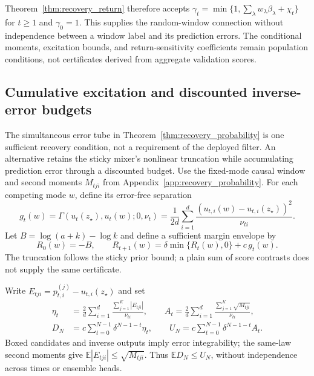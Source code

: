 Theorem~\ref{thm:recovery_return} therefore accepts
$\gamma_t=\min\{1,\sum_\lambda w_\lambda\beta_\lambda+\chi_t\}$ for $t\ge1$ and $\gamma_0=1$.
This supplies the random-window connection without independence between a window label and its prediction errors.
The conditional moments, excitation bounds, and return-sensitivity coefficients remain population conditions, not certificates derived from aggregate validation scores.

\subsection{Cumulative excitation and discounted inverse-error budgets}
\label{app:cumulative_recovery}

The simultaneous error tube in Theorem~\ref{thm:recovery_probability} is one sufficient recovery condition, not a requirement of the deployed filter.
An alternative retains the sticky mixer's nonlinear truncation while accumulating prediction error through a discounted budget.
Use the fixed-mode causal window and second moments $M_{tji}$ from Appendix~\ref{app:recovery_probability}.
For each competing mode $w$, define its error-free separation
\begin{equation}
 g_t(w)=\Gamma(u_t(z_\star),u_t(w);0,\nu_t)
 =\frac{1}{2d}\sum_{i=1}^{d}
 \frac{(u_{t,i}(w)-u_{t,i}(z_\star))^2}{\nu_{ti}}.
 \label{eq:cumulative_ideal_separation}
\end{equation}
Let $B=\log(a+k)-\log k$ and define a sufficient margin envelope by
\begin{equation}
 R_0(w)=-B,\qquad
 R_{t+1}(w)=\delta\min\{R_t(w),0\}+c\,g_t(w).
 \label{eq:cumulative_margin_recursion}
\end{equation}
The truncation follows the sticky prior bound; a plain sum of score contrasts does not supply the same certificate.

Write $E_{tji}=p_{t,i}^{(j)}-u_{t,i}(z_\star)$ and set
\begin{align}
 \eta_t&=\frac{2}{d}\sum_{i=1}^{d}
 \frac{\sum_{j=1}^{K}|E_{tji}|}{\nu_{ti}},\qquad
 A_t=\frac{2}{d}\sum_{i=1}^{d}
 \frac{\sum_{j=1}^{K}\sqrt{M_{tji}}}{\nu_{ti}},\\
 D_N&=c\sum_{t=0}^{N-1}\delta^{N-1-t}\eta_t,\qquad
 U_N=c\sum_{t=0}^{N-1}\delta^{N-1-t}A_t.
 \label{eq:discounted_inverse_error_budget}
\end{align}
Boxed candidates and inverse outputs imply error integrability; the same-law second moments give $\mathbb E|E_{tji}|\le\sqrt{M_{tji}}$.
Thus $\mathbb E D_N\le U_N$, without independence across times or ensemble heads.

